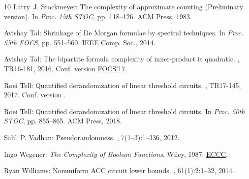 \documentclass[11pt]{article}
\numberwithin{equation}{section}
\theoremstyle{definition}
\theoremstyle{plain}
\begin{document}
\begin{thebibliography}{10}
{\sc Larry~J. Stockmeyer}: The complexity of approximate counting
  ({P}reliminary version).
\newblock In {\em Proc. 15th STOC}, pp. 118--126. ACM Press, 1983.
\newblock [\epfmtdoi{10.1145/800061.808740}]

{\sc Avishay Tal}: Shrinkage of {D}e {M}organ formulae by spectral techniques.
\newblock In {\em Proc. 55th FOCS}, pp. 551--560. IEEE Comp. Soc., 2014.

{\sc Avishay Tal}: The bipartite formula complexity of inner-product is
  quadratic.
, TR16-181, 2016.
\newblock Conf. version
  \href{https://doi.org/10.1145/3055399.3055472}{FOCS'17}.

{\sc Roei Tell}: Quantified derandomization of linear threshold circuits.
, TR17-145, 2017.
\newblock Conf. version \cite{RoeiTell18}.

{\sc Roei Tell}: Quantified derandomization of linear threshold circuits.
\newblock In {\em Proc. 50th STOC}, pp. 855--865. ACM Press, 2018.

{\sc Salil~P. Vadhan}: Pseudorandomness.
, 7(1--3):1--336, 2012.
\newblock [\epfmtdoi{10.1561/0400000010}]

{\sc Ingo Wegener}: {\em The Complexity of Boolean Functions}.
\newblock Wiley, 1987.
\newblock
  \href{https://eccc.weizmann.ac.il/static/books/The_Complexity_of_Boolean_Functions/}{ECCC}.

{\sc Ryan Williams}: Nonuniform {ACC} circuit lower bounds.
, 61(1):2:1--32, 2014.
\newblock [\epfmtdoi{10.1145/2559903}]

\end{thebibliography}
\end{document}
